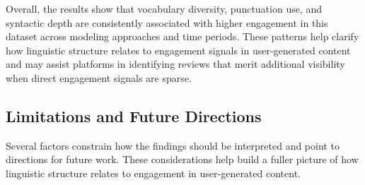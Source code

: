 \documentclass[12pt]{article}
\begin{document}
Overall, the results show that vocabulary diversity, punctuation use, and syntactic depth are consistently associated with higher engagement in this dataset across modeling approaches and time periods. These patterns help clarify how linguistic structure relates to engagement signals in user-generated content and may assist platforms in identifying reviews that merit additional visibility when direct engagement signals are sparse.


\subsection{Limitations and Future Directions}


Several factors constrain how the findings should be interpreted and point to directions for future work. These considerations help build a fuller picture of how linguistic structure relates to engagement in user-generated content.
\end{document}
